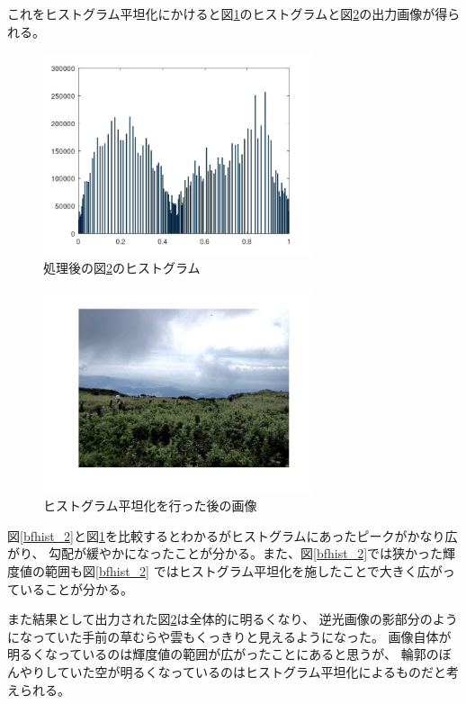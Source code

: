\documentclass[a4paper,11pt,dvipdfmx]{jsarticle}
\begin{document}
これをヒストグラム平坦化にかけると図\ref{afhist_2}のヒストグラムと図\ref{afMtIbuki}の出力画像が得られる。
\begin{figure}[htbp]
    \centering
    \includegraphics[width=80mm]{./img/flatten_afterfunc.jpg}
    \caption{処理後の図\ref{afMtIbuki}のヒストグラム}
    \label{afhist_2}
\end{figure}
\begin{figure}[htbp]
    \centering
    \includegraphics[width=80mm]{./img/flatten_afterimg.jpg}
    \caption{ヒストグラム平坦化を行った後の画像}
    \label{afMtIbuki}
\end{figure}

図\ref{bfhist_2}と図\ref{afhist_2}を比較するとわかるがヒストグラムにあったピークがかなり広がり、
勾配が緩やかになったことが分かる。また、図\ref{bfhist_2}では狭かった輝度値の範囲も図\ref{bfhist_2}
ではヒストグラム平坦化を施したことで大きく広がっていることが分かる。

また結果として出力された図\ref{afMtIbuki}は全体的に明るくなり、
逆光画像の影部分のようになっていた手前の草むらや雲もくっきりと見えるようになった。
画像自体が明るくなっているのは輝度値の範囲が広がったことにあると思うが、
輪郭のぼんやりしていた空が明るくなっているのはヒストグラム平坦化によるものだと考えられる。
\end{document}

